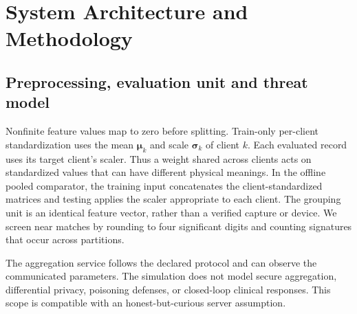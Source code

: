 \documentclass[nolineno]{ieeeaccess}
\begin{document}
\section{System Architecture and Methodology}\label{sec:methods}
\subsection{Preprocessing, evaluation unit and threat model}
Nonfinite feature values map to zero before splitting. Train-only per-client standardization uses the mean $\boldsymbol{\mu}_k$ and scale $\boldsymbol{\sigma}_k$ of client $k$. Each evaluated record uses its target client's scaler. Thus a weight shared across clients acts on standardized values that can have different physical meanings. In the offline pooled comparator, the training input concatenates the client-standardized matrices and testing applies the scaler appropriate to each client. The grouping unit is an identical feature vector, rather than a verified capture or device. We screen near matches by rounding to four significant digits and counting signatures that occur across partitions.

The aggregation service follows the declared protocol and can observe the communicated parameters. The simulation does not model secure aggregation, differential privacy, poisoning defenses, or closed-loop clinical responses. This scope is compatible with an honest-but-curious server assumption.
\end{document}
